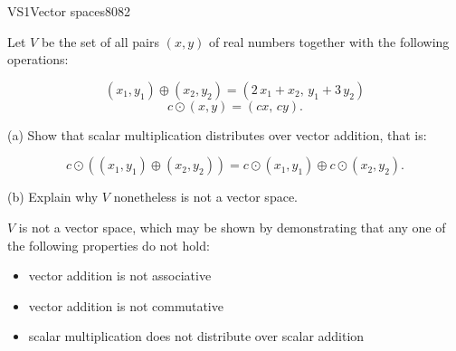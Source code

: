 \begin{exercise}{VS1}{Vector spaces}{8082} 
\begin{exerciseStatement} 

 Let \(V\) be the set of all pairs \((x,y)\) of real numbers together with the following operations: 

 \[(x_1,y_1)\oplus (x_2,y_2)=\left(2 \, x_{1} + x_{2},\,y_{1} + 3 \, y_{2}\right)\]\[c \odot (x,y) =\left(c x,\,c y\right).\] 

 (a) Show that scalar multiplication distributes over vector addition, that is: 

 \[
      c\odot \left((x_1,y_1)\oplus(x_2,y_2)\right)=c\odot(x_1,y_1)\oplus c\odot(x_2,y_2).
    \] 

 (b) Explain why \(V\) nonetheless is not a vector space. 

 \end{exerciseStatement}
 \begin{exerciseAnswer} 

 \(V\) is not a vector space, which may be shown by demonstrating that any one of the following properties do not hold: 

 

\begin{itemize}
\item vector addition is not associative
\item vector addition is not commutative
\item scalar multiplication does not distribute over scalar addition
\end{itemize}

     \end{exerciseAnswer}
 \end{exercise}


